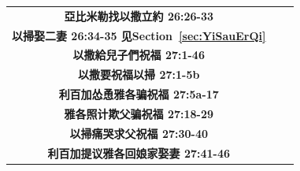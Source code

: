 \begin{table}[!hbp]
\begin{threeparttable}
\begin{tabular}{c c c}
\multicolumn{1}{L{\dimexpr0.5\linewidth-1\tabcolsep\relax}}{\bfseries 亞比米勒找以撒立約 26:26-33}  
& \multicolumn{1}{L{\dimexpr0.2\linewidth-1\tabcolsep\relax}}{\bfseries }
& \multicolumn{1}{L{\dimexpr0.1\linewidth-1\tabcolsep\relax}}{\bfseries }\\ 

\multicolumn{1}{L{\dimexpr0.5\linewidth-1\tabcolsep\relax}}{\bfseries 以掃娶二妻 26:34-35 见Section~\ref{sec:YiSauErQi}}  
& \multicolumn{1}{L{\dimexpr0.2\linewidth-1\tabcolsep\relax}}{\bfseries }
& \multicolumn{1}{L{\dimexpr0.1\linewidth-1\tabcolsep\relax}}{\bfseries }\\ 


\multicolumn{1}{L{\dimexpr0.5\linewidth-1\tabcolsep\relax}}{\bfseries 以撒給兒子們祝福 27:1-46}  
& \multicolumn{1}{L{\dimexpr0.2\linewidth-1\tabcolsep\relax}}{\bfseries }
& \multicolumn{1}{L{\dimexpr0.1\linewidth-1\tabcolsep\relax}}{\bfseries }\\ 

\multicolumn{1}{L{\dimexpr0.5\linewidth-1\tabcolsep\relax}}{\bfseries 以撒要祝福以掃 27:1-5b}  
& \multicolumn{1}{L{\dimexpr0.2\linewidth-1\tabcolsep\relax}}{\bfseries }
& \multicolumn{1}{L{\dimexpr0.1\linewidth-1\tabcolsep\relax}}{\bfseries }\\ 

\multicolumn{1}{L{\dimexpr0.5\linewidth-1\tabcolsep\relax}}{\bfseries 利百加怂恿雅各骗祝福 27:5a-17}  
& \multicolumn{1}{L{\dimexpr0.2\linewidth-1\tabcolsep\relax}}{\bfseries }
& \multicolumn{1}{L{\dimexpr0.1\linewidth-1\tabcolsep\relax}}{\bfseries }\\ 

\multicolumn{1}{L{\dimexpr0.5\linewidth-1\tabcolsep\relax}}{\bfseries 雅各照计欺父骗祝福 27:18-29}  
& \multicolumn{1}{L{\dimexpr0.2\linewidth-1\tabcolsep\relax}}{\bfseries }
& \multicolumn{1}{L{\dimexpr0.1\linewidth-1\tabcolsep\relax}}{\bfseries }\\ 

\multicolumn{1}{L{\dimexpr0.5\linewidth-1\tabcolsep\relax}}{\bfseries 以掃痛哭求父祝福 27:30-40}  
& \multicolumn{1}{L{\dimexpr0.2\linewidth-1\tabcolsep\relax}}{\bfseries }
& \multicolumn{1}{L{\dimexpr0.1\linewidth-1\tabcolsep\relax}}{\bfseries }\\ 

\multicolumn{1}{L{\dimexpr0.5\linewidth-1\tabcolsep\relax}}{\bfseries 利百加提议雅各回娘家娶妻 27:41-46}  
& \multicolumn{1}{L{\dimexpr0.2\linewidth-1\tabcolsep\relax}}{\bfseries }
& \multicolumn{1}{L{\dimexpr0.1\linewidth-1\tabcolsep\relax}}{\bfseries }\\ 


\end{tabular}
\end{threeparttable}
\end{table}
